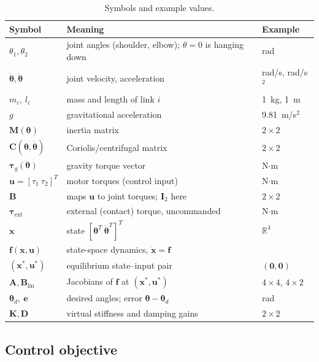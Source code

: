 \documentclass[letterpaper, 10pt, conference]{ieeeconf}
\begin{document}
\begin{table}[htbp]
\centering
\caption{Symbols and example values.}
\label{tab:notation}
\footnotesize
\begin{tabular}{@{}p{}p{}p{}@{}}
\toprule
Symbol & Meaning & Example \\
\midrule
$\theta_1,\theta_2$ & joint angles (shoulder, elbow); $\theta=0$ is hanging down & rad \\
$\dot{\boldsymbol{\theta}},\ddot{\boldsymbol{\theta}}$ & joint velocity, acceleration & rad/s, rad/s$^2$ \\
$m_i,\ l_i$ & mass and length of link $i$ & 1~kg, 1~m \\
$g$ & gravitational acceleration & 9.81~m/s$^2$ \\
$\mathbf{M}(\boldsymbol{\theta})$ & inertia matrix & $2\times2$ \\
$\mathbf{C}(\boldsymbol{\theta},\dot{\boldsymbol{\theta}})$ & Coriolis/centrifugal matrix & $2\times2$ \\
$\boldsymbol{\tau}_g(\boldsymbol{\theta})$ & gravity torque vector & N$\cdot$m \\
$\mathbf{u}=[\tau_1\ \tau_2]^T$ & motor torques (control input) & N$\cdot$m \\
$\mathbf{B}$ & maps $\mathbf{u}$ to joint torques; $\mathbf{I}_2$ here & $2\times2$ \\
$\boldsymbol{\tau}_{\mathrm{ext}}$ & external (contact) torque, uncommanded & N$\cdot$m \\
$\mathbf{x}$ & state $[\boldsymbol{\theta}^T\ \dot{\boldsymbol{\theta}}^T]^T$ & $\mathbb{R}^4$ \\
$\mathbf{f}(\mathbf{x},\mathbf{u})$ & state-space dynamics, $\dot{\mathbf{x}}=\mathbf{f}$ & \\
$(\mathbf{x}^*,\mathbf{u}^*)$ & equilibrium state--input pair & $(\mathbf{0},\mathbf{0})$ \\
$\mathbf{A},\mathbf{B}_{\mathrm{lin}}$ & Jacobians of $\mathbf{f}$ at $(\mathbf{x}^*,\mathbf{u}^*)$ & $4\times4$, $4\times2$ \\
$\boldsymbol{\theta}_d,\ \mathbf{e}$ & desired angles; error $\boldsymbol{\theta}-\boldsymbol{\theta}_d$ & rad \\
$\mathbf{K},\mathbf{D}$ & virtual stiffness and damping gains & $2\times2$ \\
\bottomrule
\end{tabular}
\end{table}

\subsection{Control objective}
\label{sec:objective}
\end{document}

